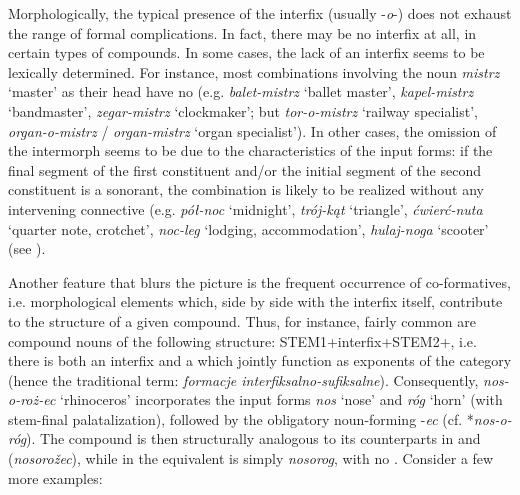 \documentclass[output=paper]{LSP/langsci}
\begin{document}
{Morphologically, the typical presence of the interfix (usually -}{\textit{o}}{-) does not exhaust the range of formal complications. In fact, there may be no interfix at all, in certain types of compounds. In some cases, the lack of an interfix seems to be lexically determined. For instance, most combinations involving the noun} {\textit{mistrz}} {‘master’ as their head have no  (e.g.} {\textit{balet-mistrz}} {‘ballet master’,} {\textit{kapel-mistrz}} {‘bandmaster’,} {\textit{zegar-mistrz}} {‘clockmaker’; but} {\textit{tor-o-mistrz}} {‘railway specialist’,} {\textit{organ-o-mistrz}} {/} {\textit{organ-mistrz}} {‘organ specialist’). In other cases, the omission of the intermorph seems to be due to the  characteristics of the input forms: if the final segment of the first constituent and/or the initial segment of the second constituent is a sonorant, the combination is likely to be realized without any intervening connective (e.g.} {\textit{pół-noc}} {‘midnight’,} {\textit{trój-kąt}} {‘triangle’,} {\textit{ćwierć-nuta} }{‘quarter note, crotchet’,} {\textit{noc-leg}} {‘lodging, accommodation’,} {\textit{hulaj-noga}} {‘scooter’ (see \citealt[68]{Kurzowa1976}).}


{Another feature that blurs the picture is the frequent occurrence of co-for\-ma\-tives, i.e. morphological elements which, side by side with the interfix itself, contribute to the structure of a given compound. Thus, for instance, fairly common are compound nouns of the following structure: STEM1+interfix+STEM2+, i.e. there is both an interfix and a  which jointly function as exponents of the category (hence the  traditional term:} {\textit{formacje interfiksalno-sufiksalne}}{). Consequently,} {\textit{nos-o-roż-ec}} {‘rhinoceros’ incorporates the input forms} {\textit{nos}} {‘nose’ and} {\textit{róg}} {‘horn’ (with stem-final palatalization), followed by the obligatory noun-forming  -}{\textit{ec}} {(cf. *}{\textit{nos-o-róg}}{). The compound is then structurally analogous to its counterparts in  and  (}{\textit{nosorožec}}{), while in  the equivalent is simply} {\textit{nosorog}}{, with no . Consider a few more  examples:}
\end{document}
